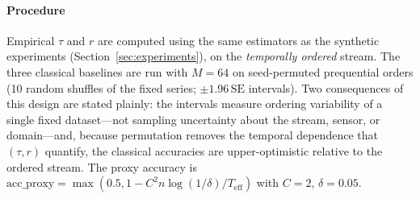 \documentclass[sensors,article,submit,pdftex,moreauthors]{Definitions/mdpi}
\newcommand{\Teff}{T_{\mathrm{eff}}}
\providecommand{\DIFadd}[1]{{\protect\color{blue}#1}} %
\providecommand{\DIFdel}[1]{} %
\providecommand{\DIFaddbegin}{} %
\providecommand{\DIFaddend}{} %
\providecommand{\DIFdelbegin}{} %
\providecommand{\DIFdelend}{} %
\begin{document}
\paragraph{Procedure} Empirical $\tau$ and $r$ are computed using the same estimators as the synthetic experiments (Section~\ref{sec:experiments})\DIFaddbegin \DIFadd{, on the }\emph{\DIFadd{temporally ordered}} \DIFadd{stream}\DIFaddend . The three classical baselines are run with $M = 64$ on seed-permuted prequential orders (10 \DIFdelbegin \DIFdel{seeds, 95\% confidence }\DIFdelend \DIFaddbegin \DIFadd{random shuffles of the fixed series; $\pm 1.96\,\mathrm{SE}$ }\DIFaddend intervals). \DIFaddbegin \DIFadd{Two consequences of this design are stated plainly: the intervals measure ordering variability of a single fixed dataset---not sampling uncertainty about the stream, sensor, or domain---and, because permutation removes the temporal dependence that $(\tau, r)$ quantify, the classical accuracies are upper-optimistic relative to the ordered stream. }\DIFaddend The proxy accuracy is $\mathrm{acc\_proxy} = \max(0.5, 1 - C^2 n \log(1/\delta) / \Teff)$ with $C = 2$, $\delta = 0.05$.
\end{document}
